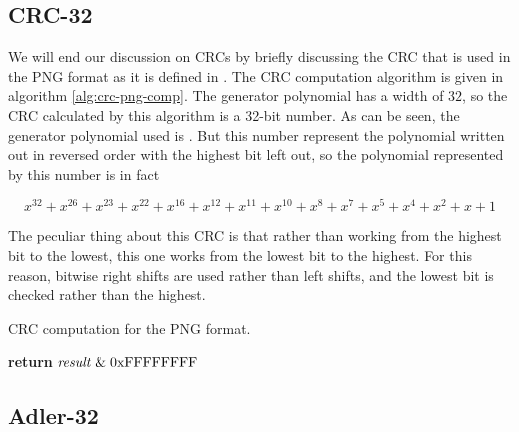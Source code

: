 \subsection{CRC-32}
\label{sec:pngcrc}

We will end our discussion on CRCs by briefly discussing the CRC that
is used in the PNG format as it is defined in
\cite{boutel:_png_portab_networ_graph_specif_version12}. The CRC
computation algorithm is given in algorithm
\ref{alg:crc-png-comp}. The generator polynomial has a width of $32$,
so the CRC calculated by this algorithm is a 32-bit number. As can be
seen, the generator polynomial used is . But this number
represent the polynomial written out in reversed order with the highest bit
left out, so the polynomial represented by this number is in fact

\begin{equation*}
  x^{32} + x^{26} + x^{23} + x^{22} + x^{16} + x^{12} + x^{11} + x^{10} + x^8 + x^7 + x^5 + x^4 + x^2 + x + 1
\end{equation*}

The peculiar thing about this CRC is that rather than working from the
highest bit to the lowest, this one works from the lowest bit to the
highest. For this reason, bitwise right shifts are used rather than
left shifts, and the lowest bit is checked rather than the
highest.

\begin{algorithm}[H]
  \caption{CRC computation for the PNG format.}
  \label{alg:crc-png-comp}
  \begin{algorithmic}[1]


    \Else
    \EndIf
    \EndRepeatn

    \EndForEach

    \State \textbf{return}  $\mathit{result} \mathrel{\&} \mathrm{0xFFFFFFFF}$
    \EndProcedure

  \end{algorithmic}
\end{algorithm}


\subsection{Adler-32}
\label{sec:adler32}

